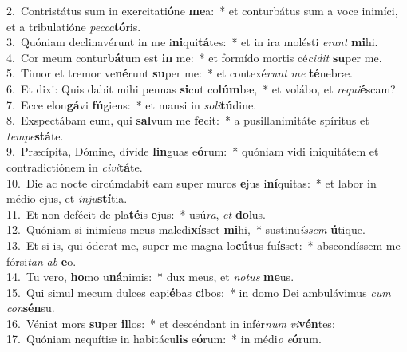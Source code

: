 {2.~}Contristátus sum in exercitati\textbf{ó}ne \textbf{me}a:~* et conturbátus sum a voce inimíci, et a tribulatióne \textit{pec}\textit{ca}\textbf{tó}ris.\\
{3.~}Quóniam declinavérunt in me i\textbf{ni}qui\textbf{tá}tes:~* et in ira molésti \textit{e}\textit{rant} \textbf{mi}hi.\\
{4.~}Cor meum contur\textbf{bá}tum est \textbf{in} me:~* et formído mortis cé\textit{ci}\textit{dit} \textbf{su}per me.\\
{5.~}Timor et tremor ve\textbf{né}runt \textbf{su}per me:~* et contexé\textit{runt} \textit{me} \textbf{té}nebræ.\\
{6.~}Et dixi: Quis dabit mihi pennas \textbf{si}cut co\textbf{lúm}bæ,~* et volábo, et \textit{re}\textit{qui}\textbf{é}scam?\\
{7.~}Ecce elon\textbf{gá}vi \textbf{fú}giens:~* et mansi in \textit{so}\textit{li}\textbf{tú}dine.\\
{8.~}Exspectábam eum, qui \textbf{sal}vum me \textbf{fe}cit:~* a pusillanimitáte spíritus et \textit{tem}\textit{pe}\textbf{stá}te.\\
{9.~}Præcípita, Dómine, dívide \textbf{lin}guas e\textbf{ó}rum:~* quóniam vidi iniquitátem et contradictiónem in \textit{ci}\textit{vi}\textbf{tá}te.\\
{10.~}Die ac nocte circúmdabit eam super muros \textbf{e}jus i\textbf{ní}quitas:~* et labor in médio ejus, et \textit{in}\textit{ju}\textbf{stí}tia.\\
{11.~}Et non defécit de pla\textbf{té}is \textbf{e}jus:~* usú\textit{ra}, \textit{et} \textbf{do}lus.\\
{12.~}Quóniam si inimícus meus maledi\textbf{xís}set \textbf{mi}hi,~* sustinu\textit{ís}\textit{sem} \textbf{ú}tique.\\
{13.~}Et si is, qui óderat me, super me magna lo\textbf{cú}tus fu\textbf{ís}set:~* abscondíssem me fórsi\textit{tan} \textit{ab} \textbf{e}o.\\
{14.~}Tu vero, \textbf{ho}mo u\textbf{ná}nimis:~* dux meus, et \textit{no}\textit{tus} \textbf{me}us.\\
{15.~}Qui simul mecum dulces capi\textbf{é}bas \textbf{ci}bos:~* in domo Dei ambulávimus \textit{cum} \textit{con}\textbf{sén}su.\\
{16.~}Véniat mors \textbf{su}per \textbf{il}los:~* et descéndant in infér\textit{num} \textit{vi}\textbf{vén}tes:\\
{17.~}Quóniam nequítiæ in habitácu\textbf{lis} e\textbf{ó}rum:~* in médi\textit{o} \textit{e}\textbf{ó}rum.\\

